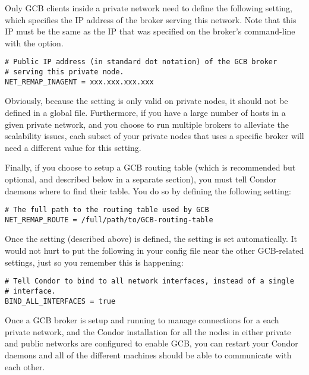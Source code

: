 Only GCB clients inside a private network need to define the following
setting, which specifies the IP address of the broker serving this
network.
Note that this IP must be the same as the IP that was specified on the
broker's command-line with the  option.

\footnotesize
\begin{verbatim}
# Public IP address (in standard dot notation) of the GCB broker
# serving this private node.
NET_REMAP_INAGENT = xxx.xxx.xxx.xxx
\end{verbatim}
\normalsize

Obviously, because the  setting is only
valid on private nodes, it should not be defined in a global
 file.
Furthermore, if you have a large number of hosts in a given private
network, and you choose to run multiple brokers to alleviate the
scalability issues, each subset of your private nodes that uses a
specific broker will need a different value for this setting.

Finally, if you choose to setup a GCB routing table (which is
recommended but optional, and described below in a separate section),
you must tell Condor daemons where to find their table.
You do so by defining the following setting:

\footnotesize
\begin{verbatim}
# The full path to the routing table used by GCB
NET_REMAP_ROUTE = /full/path/to/GCB-routing-table
\end{verbatim}
\normalsize

Once the  setting (described above) is
defined, the  setting is set
automatically.
It would not hurt to put the following in your config file near the
other GCB-related settings, just so you remember this is happening:

\footnotesize
\begin{verbatim}
# Tell Condor to bind to all network interfaces, instead of a single
# interface.
BIND_ALL_INTERFACES = true
\end{verbatim}
\normalsize

Once a GCB broker is setup and running to manage connections for a
each private network, and the Condor installation for all the nodes in
either private and public networks are configured to enable GCB, you
can restart your Condor daemons and all of the different machines
should be able to communicate with each other.


